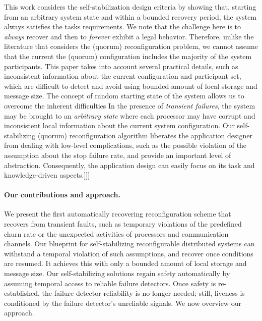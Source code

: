 \documentclass[11pt]{article}
\begin{document}
{This work considers the self-stabilization design criteria by showing that, starting from an arbitrary system state and within a bounded recovery period, the system always satisfies the tasks requirements. We note that the challenge here is to \emph{always} recover and then to \emph{forever} exhibit a legal behavior. Therefore, unlike the literature that considers the (quorum) reconfiguration problem, we cannot assume that the current the (quorum) configuration includes the majority of the system participants. This paper takes into account several practical details, such as inconsistent information about the current configuration and participant set, which are difficult to detect and avoid using bounded amount of local storage and message size. The concept of random starting state of the system allows us to overcome the inherent difficulties
In the presence of {\em transient failures}, the system may be brought to an {\em arbitrary state} where each processor may have corrupt and inconsistent local information about the current system configuration. 
Our self-stabilizing (quorum) reconfiguration algorithm liberates the application designer from dealing with low-level complications, such as the possible violation of the assumption about the stop failure rate, and provide an important level of abstraction. Consequently, the application design can easily focus on its task and knowledge-driven aspects.]]]
}

\paragraph{Our contributions and approach.}
We present the first automatically recovering reconfiguration scheme that recovers from transient faults, such as temporary violations of the predefined churn rate or the unexpected activities of processors and communication channels. Our blueprint for self-stabilizing reconfigurable distributed systems can withstand a temporal violation of such assumptions, and recover once conditions are resumed. It achieves this with only a bounded amount of local storage and message size. Our self-stabilizing solutions regain safety automatically by assuming temporal access to reliable failure detectors. Once safety is re-established, the failure detector reliability is no longer needed; still, liveness is conditioned by the failure detector's unreliable signals.  We now overview our approach.\vspace{.3em} 
\end{document}
